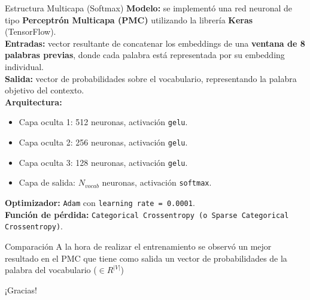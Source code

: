 \documentclass{beamer}
\begin{document}
\begin{frame}{Estructura Multicapa (Softmax)}
	\small
	\textbf{Modelo:} se implementó una red neuronal de tipo \textbf{Perceptrón Multicapa (PMC)} utilizando la librería \textbf{Keras} (TensorFlow).\\[0.4em]
	
	\textbf{Entradas:} vector resultante de concatenar los embeddings de una \textbf{ventana de 8 palabras previas}, donde cada palabra está representada por su embedding individual.\\[0.4em]
	
	\textbf{Salida:} vector de probabilidades sobre el vocabulario, representando la palabra objetivo del contexto.\\[0.4em]
	
	\textbf{Arquitectura:}
	\begin{itemize}
		\item Capa oculta 1: 512 neuronas, activación \texttt{gelu}.
		\item Capa oculta 2: 256 neuronas, activación \texttt{gelu}.
		\item Capa oculta 3: 128 neuronas, activación \texttt{gelu}.
		\item Capa de salida: $N_{vocab}$ neuronas, activación \texttt{softmax}.
	\end{itemize}
	
	\textbf{Optimizador:} \texttt{Adam} con \texttt{learning rate = 0.0001}.\\
	\textbf{Función de pérdida:} \texttt{Categorical Crossentropy (o Sparse Categorical Crossentropy)}.
\end{frame}

\begin{frame}[fragile]{Comparación}
	A la hora de realizar el entrenamiento se observó un mejor resultado en el PMC que tiene como salida un vector de probabilidades de la palabra del vocabulario ($\in R^{|V|}$) 
\end{frame}

\begin{frame}{}
	\centering
	{\huge ¡Gracias!}\\
\end{frame}
	
\end{document}
